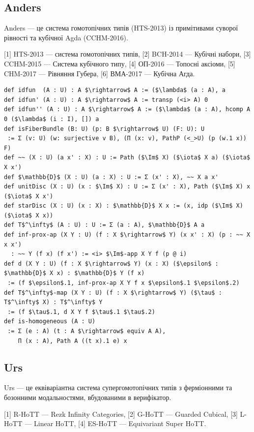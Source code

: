 \newpage
\subsection*{Anders}

Anders — це система гомотопічних типів (HTS-2013) із примітивами суворої рівності та кубічної Agda (CCHM-2016).

[1] HTS-2013 — система гомотопічних типів,
[2] BCH-2014 — Кубічні набори,
[3] CCHM-2015 — Система кубічного типу,
[4] ОП-2016 — Топосні аксіоми,
[5] CHM-2017 — Рівняння Губера,
[6] ВМА-2017 — Кубічна Агда.

\begin{lstlisting}
def idfun  (A : U) : A $\rightarrow$ A := ($\lambda$ (a : A), a
def idfun' (A : U) : A $\rightarrow$ A := transp (<i> A) 0
def idfun'' (A : U) : A $\rightarrow$ A := ($\lambda$ (a : A), hcomp A 0 ($\lambda$ (i : I), []) a
def isFiberBundle (B: U) (p: B $\rightarrow$ U) (F: U): U
 := Σ (v: U) (w: surjective v B), (Π (x: v), PathP (<_>U) (p (w.1 x)) F)
def ~~ (X : U) (a x' : X) : U := Path ($\Im$ X) ($\iota$ X a) ($\iota$ X x')
def $\mathbb{D}$ (X : U) (a : X) : U := Σ (x' : X), ~~ X a x'
def unitDisc (X : U) (x : $\Im$ X) : U := Σ (x' : X), Path ($\Im$ X) x ($\iota$ X x')
def starDisc (X : U) (x : X) : $\mathbb{D}$ X x := (x, idp ($\Im$ X) ($\iota$ X x))
def T$^\infty$ (A : U) : U := Σ (a : A), $\mathbb{D}$ A a
def inf-prox-ap (X Y : U) (f : X $\rightarrow$ Y) (x x' : X) (p : ~~ X x x')
  : ~~ Y (f x) (f x') := <i> $\Im$-app X Y f (p @ i)
def d (X Y : U) (f : X $\rightarrow$ Y) (x : X) ($\epsilon$ : $\mathbb{D}$ X x) : $\mathbb{D}$ Y (f x)
 := (f $\epsilon$.1, inf-prox-ap X Y f x $\epsilon$.1 $\epsilon$.2)
def T$^\infty$-map (X Y : U) (f : X $\rightarrow$ Y) ($\tau$ : T$^\infty$ X) : T$^\infty$ Y
 := (f $\tau$.1, d X Y f $\tau$.1 $\tau$.2)
def is-homogeneous (A : U)
 := Σ (e : A) (t : A $\rightarrow$ equiv A A),
    Π (x : A), Path A ((t x).1 e) x
\end{lstlisting}

\subsection*{Urs}

Urs — це еквіваріантна система супергомотопічних типів з ферміонними та бозонними модальностями,
вбудованими в верифікатор.

[1] R-HoTT — Rezk Infinity Categories,
[2] G-HoTT — Guarded Cubical,
[3] L-HoTT — Linear HoTT,
[4] ES-HoTT — Equivariant Super HoTT.

